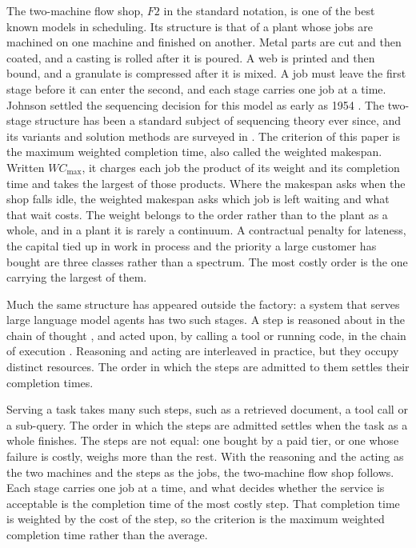 \documentclass[12pt]{article}
\begin{document}
\begin{sloppypar}
The two-machine flow shop, $F2$ in the standard notation, is one of the best known models
in scheduling. Its structure is that of a plant whose jobs are machined on one machine and
finished on another. Metal parts are cut and then coated, and a casting is rolled after it
is poured. A web is printed and then bound, and a granulate is compressed after it is
mixed. A job must leave the first stage before it can enter the second, and each stage
carries one job at a time. Johnson settled the sequencing decision for this model as early as 1954
\citep{johnson1954optimal}. The two-stage structure has been a standard subject of
sequencing theory ever since, and its variants and solution methods are surveyed in
\citep{pinedo2022scheduling}. The criterion of this paper is the maximum weighted
completion time, also called the weighted makespan. Written $WC_{\max}$, it charges each
job the product of its weight and its completion time and takes the largest of those
products. Where the makespan asks when the shop falls idle, the weighted makespan asks
which job is left waiting and what that wait costs. The weight belongs to the order rather
than to the plant as a whole, and in a plant it is rarely a continuum. A contractual
penalty for lateness, the capital tied up in work in process and the priority a large
customer has bought are three classes rather than a spectrum. The most costly order is the
one carrying the largest of them.

Much the same structure has appeared outside the factory: a system that serves large
language model agents has two such stages. A step is reasoned about in the chain of thought
\citep{wei2022chain}, and acted upon, by calling a tool or running code, in the chain of
execution \citep{yao2023react}. Reasoning and acting are interleaved in practice, but they
occupy distinct resources. The order in which the steps are admitted to them settles their
completion times.

Serving a task takes many such steps, such as a retrieved document, a tool call or a
sub-query. The order in which the steps are admitted settles when the task as a whole
finishes. The steps are not equal: one bought by a paid tier, or one whose failure is
costly, weighs more than the rest. With the reasoning and the acting as the two machines
and the steps as the jobs, the two-machine flow shop follows. Each stage carries one job at
a time, and what decides whether the service is acceptable is the completion time of the
most costly step. That completion time is weighted by the cost of the step, so the
criterion is the maximum weighted completion time rather than the average.


\end{sloppypar}
\end{document}
